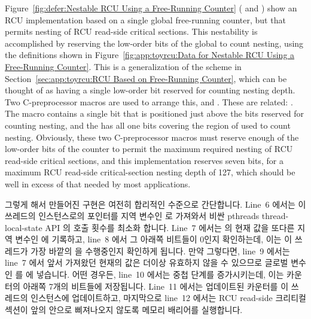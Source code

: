 Figure~\ref{fig:defer:Nestable RCU Using a Free-Running Counter}
( and )
show an RCU implementation based on a single global free-running counter,
but that permits nesting of RCU read-side critical sections.
This nestability is accomplished by reserving the low-order bits of the
global  to count nesting, using the definitions shown in
Figure~\ref{fig:app:toyrcu:Data for Nestable RCU Using a Free-Running Counter}.
This is a generalization of the scheme in
Section~\ref{sec:app:toyrcu:RCU Based on Free-Running Counter},
which can be thought of as having a single low-order bit reserved
for counting nesting depth.
Two C-preprocessor macros are used to arrange this,
 and
.
These are related: .
The  macro contains a single bit that is
positioned just above the bits reserved for counting nesting,
and the  has all one bits covering the
region of  used to count nesting.
Obviously, these two C-preprocessor macros must reserve enough
of the low-order bits of the counter to permit the maximum required
nesting of RCU read-side critical sections, and this implementation
reserves seven bits, for a maximum RCU read-side critical-section
nesting depth of 127, which should be well in excess of that needed
by most applications.
\fi

그렇게 해서 만들어진  구현은 여전히 합리적인 수준으로
간단합니다.
Line~6 에서는 이 쓰레드의  인스턴스로의 포인터를 지역 변수인
 로 가져와서 비싼 pthreads thread-local-state API 의 호출 횟수를
최소화 합니다.
Line~7 에서는  의 현재 값을 또다른 지역 변수인  에
기록하고, line~8 에서 그 아래쪽 비트들이 0인지 확인하는데, 이는 이 쓰레드가
가장 바깥의  을 수행중인지 확인하게 됩니다.
만약 그렇다면, line~9 에서는 line~7 에서 앞서 가져왔던 현재의 값은 더이상
유효하지 않을 수 있으므로 글로벌 변수인  를  에
넣습니다.
어떤 경우든, line~10 에서는 중첩 단계를 증가시키는데, 이는 카운터의 아래쪽
7개의 비트들에 저장됩니다.
Line~11 에서는 업데이트된 카운터를 이 쓰레드의  인스턴스에
업데이트하고, 마지막으로 line~12 에서는 RCU read-side 크리티컬 섹션이 앞의
 안으로 삐져나오지 않도록 메모리 배리어를 실행합니다.
\iffalse

